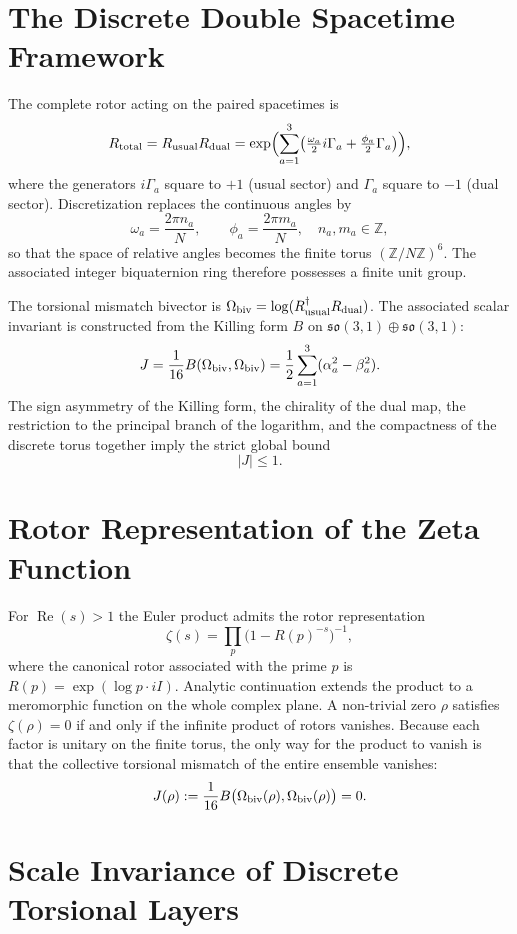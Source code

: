 \documentclass[dvipdfmx,11pt,a4paper]{article}
\begin{document}
\section{The Discrete Double Spacetime Framework}

The complete rotor acting on the paired spacetimes is
\[
R_{\rm total}=R_{\rm usual}R_{\rm dual}=\exp\Bigl(\sum_{a=1}^3\bigl(\tfrac{\omega_a}{2}i\Gamma_a+\tfrac{\phi_a}{2}\Gamma_a\bigr)\Bigr),
\]
where the generators \(i\Gamma_a\) square to \(+1\) (usual sector) and \(\Gamma_a\) square to \(-1\) (dual sector). Discretization replaces the continuous angles by
\[
\omega_a=\frac{2\pi n_a}{N},\qquad\phi_a=\frac{2\pi m_a}{N},\quad n_a,m_a\in\mathbb{Z},
\]
so that the space of relative angles becomes the finite torus \((\mathbb{Z}/N\mathbb{Z})^6\). The associated integer biquaternion ring therefore possesses a finite unit group.

The torsional mismatch bivector is \(\Omega_{\rm biv}=\log(R_{\rm usual}^\dagger R_{\rm dual})\). The associated scalar invariant is constructed from the Killing form \(B\) on \(\mathfrak{so}(3,1)\oplus\mathfrak{so}(3,1)\):
\[
J=\frac{1}{16}B(\Omega_{\rm biv},\Omega_{\rm biv})=\frac12\sum_{a=1}^3(\alpha_a^2-\beta_a^2).
\]
The sign asymmetry of the Killing form, the chirality of the dual map, the restriction to the principal branch of the logarithm, and the compactness of the discrete torus together imply the strict global bound
\[
|J|\le 1.
\]

\section{Rotor Representation of the Zeta Function}

For \(\operatorname{Re}(s)>1\) the Euler product admits the rotor representation
\[
\zeta(s)=\prod_p\bigl(1-R(p)^{-s}\bigr)^{-1},
\]
where the canonical rotor associated with the prime \(p\) is \(R(p)=\exp(\log p\cdot iI)\). Analytic continuation extends the product to a meromorphic function on the whole complex plane. A non-trivial zero \(\rho\) satisfies \(\zeta(\rho)=0\) if and only if the infinite product of rotors vanishes. Because each factor is unitary on the finite torus, the only way for the product to vanish is that the collective torsional mismatch of the entire ensemble vanishes:
\[
J(\rho):=\frac{1}{16}B\bigl(\Omega_{\rm biv}(\rho),\Omega_{\rm biv}(\rho)\bigr)=0.
\]

\section{Scale Invariance of Discrete Torsional Layers}
\end{document}
